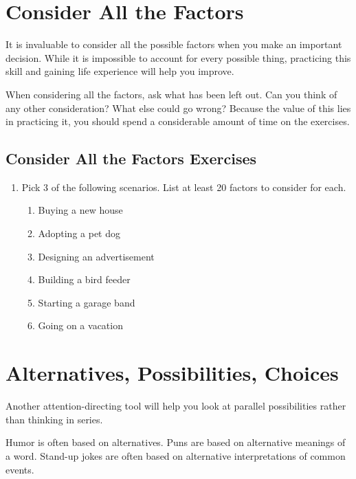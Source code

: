 \chapter{Consider All the Factors}


It is invaluable to consider all the possible factors when you make an important decision. While it is impossible to account for every possible thing, practicing this skill and gaining life experience will help you improve.

When considering all the factors, ask what has been left out. Can you think of any other consideration? What else could go wrong? Because the value of this lies in practicing it, you should spend a considerable amount of time on the exercises.

\section*{Consider All the Factors Exercises}

\begin{enumerate}
	\item Pick 3 of the following scenarios. List at least 20 factors to consider for each.
	\begin{enumerate}
		\item Buying a new house
		\item Adopting a pet dog
		\item Designing an advertisement
		\item Building a bird feeder
		\item Starting a garage band
		\item Going on a vacation
	\end{enumerate}
\end{enumerate}


\chapter{Alternatives, Possibilities, Choices}

Another attention-directing tool will help you look at parallel possibilities rather than thinking in series.

Humor is often based on alternatives. Puns are based on alternative meanings of a word. Stand-up jokes are often based on alternative interpretations of common events.


